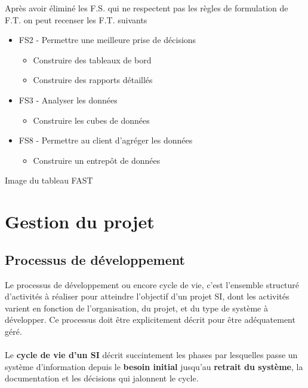 Après avoir éliminé les F.S. qui ne respectent pas les règles de formulation de F.T. on peut recenser les F.T. suivants
\begin{itemize}
    \item FS2 - Permettre une meilleure prise de décisions 
    \begin{itemize}
        \item Construire des tableaux de bord
        \item Construire des rapports détaillés
    \end{itemize}
    \item FS3 - Analyser les données
    \begin{itemize}
        \item Construire les cubes de données 
    \end{itemize}
    \item FS8 - Permettre au client d’agréger les données
    \begin{itemize}
        \item Construire un entrepôt de données
    \end{itemize}
\end{itemize}


Image du tableau FAST



\section{Gestion du projet }
\subsection{Processus de développement }
Le processus de développement ou encore cycle de vie, c'est l'ensemble structuré d'activités à réaliser pour atteindre l'objectif d'un projet SI, dont les activités varient en fonction de l'organisation, du projet, et du type de système à développer. Ce processus doit être explicitement décrit pour être adéquatement géré. 
\paragraph{}
Le \textbf{cycle de vie d'un SI} décrit succintement les phases par lesquelles passe un système d'information depuis le \textbf{besoin initial} jusqu'au \textbf{retrait du système}, la documentation et les décisions qui jalonnent le cycle.

